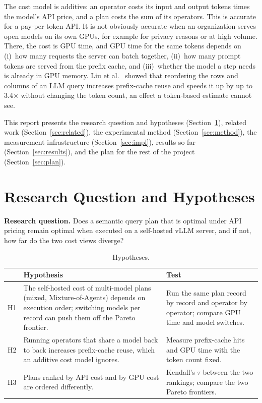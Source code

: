 \documentclass[11pt,a4paper]{article}
\begin{document}
The cost model is additive: an operator costs its input and output tokens times the model's API
price, and a plan costs the sum of its operators. This is accurate for a pay-per-token API. It is
not obviously accurate when an organization serves open models on its own GPUs, for example for
privacy reasons or at high volume. There, the cost is GPU time, and GPU time for the same tokens depends on
(i)~how many requests the server can batch together, (ii)~how many prompt tokens are served from the
prefix cache, and (iii)~whether the model a step needs is already in GPU memory. Liu et
al.~\cite{liu2025optimizing} showed that reordering the rows and columns of an LLM query increases
prefix-cache reuse and speeds it up by up to 3.4$\times$ without changing the token count, an effect
a token-based estimate cannot see.

This report presents the research question and hypotheses (Section~\ref{sec:rq}), related work
(Section~\ref{sec:related}), the experimental method (Section~\ref{sec:method}), the measurement
infrastructure (Section~\ref{sec:impl}), results so far (Section~\ref{sec:results}), and the plan for
the rest of the project (Section~\ref{sec:plan}).

\section{Research Question and Hypotheses}\label{sec:rq}

\textbf{Research question.} Does a semantic query plan that is optimal under API pricing remain
optimal when executed on a self-hosted vLLM server, and if not, how far do the two cost views
diverge?

\begin{table}[h]
\centering\small
\begin{tabularx}{\linewidth}{@{}lXX@{}}
\toprule
& Hypothesis & Test \\
\midrule
H1 & The self-hosted cost of multi-model plans (mixed, Mixture-of-Agents) depends on execution order; switching models per record can push them off the Pareto frontier. & Run the same plan record by record and operator by operator; compare GPU time and model switches. \\
H2 & Running operators that share a model back to back increases prefix-cache reuse, which an additive cost model ignores. & Measure prefix-cache hits and GPU time with the token count fixed. \\
H3 & Plans ranked by API cost and by GPU cost are ordered differently. & Kendall's $\tau$ between the two rankings; compare the two Pareto frontiers. \\
\bottomrule
\end{tabularx}
\caption{Hypotheses.}
\end{table}
\end{document}
